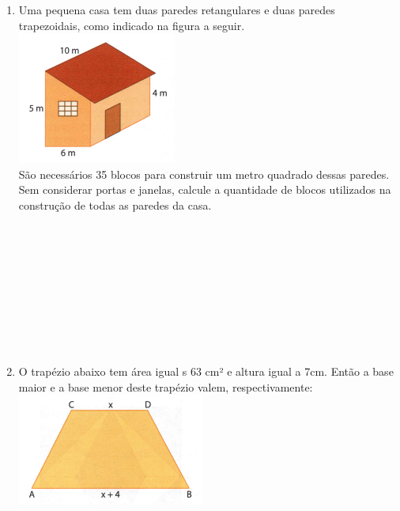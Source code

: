 \documentclass[a4paper,14pt]{article}
\begin{document}
\begin{multicols}{2}
\begin{enumerate}
	    	\item Uma pequena casa tem duas paredes retangulares e duas paredes trapezoidais, como indicado na figura a seguir.
	    	\includegraphics[width=1\linewidth]{8FMA27_imagens/pg146.png}\\
	    	São necessários 35 blocos para construir um metro quadrado dessas paredes. Sem considerar portas e janelas, calcule a quantidade de blocos utilizados na construção de todas as paredes da casa. \\\\\\\\\\\\\\\\\\\\
	    	\item O trapézio abaixo tem área igual s 63 cm² e altura igual a 7cm. Então a base maior e a base menor deste trapézio valem, respectivamente:
	    	\includegraphics[width=1\linewidth]{8FMA27_imagens/pg158-1.png}\\

\end{enumerate}
\end{multicols}
\end{document}
